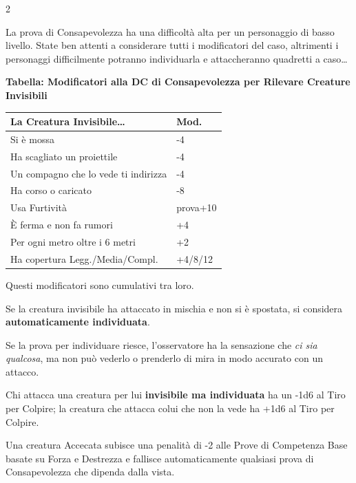 \begin{multicols}{2}
\begin{narratore}[Invisibilità]
La prova di Consapevolezza ha una difficoltà alta per un personaggio di basso livello. State ben attenti a considerare tutti i modificatori del caso, altrimenti i personaggi difficilmente potranno individuarla e attaccheranno quadretti a caso…
\end{narratore}

\bigskip

\textbf{Tabella: Modificatori alla DC di Consapevolezza per Rilevare Creature Invisibili}

\medskip

\noindent\begin{tabularx}{\linewidth}{Xl}
	\toprule
\rowcolor{gray!20}\textbf{La Creatura Invisibile…} & \textbf{Mod.}\\
\toprule
Si è mossa& -4\\
\rowcolor{gray!20}Ha scagliato un proiettile & -4\\
Un compagno che lo vede ti indirizza & -4\\
\rowcolor{gray!20}Ha corso o caricato& -8\\
Usa Furtività & prova+10\\
\rowcolor{gray!20}È ferma e non fa rumori & +4\\
Per ogni metro oltre i 6 metri & +2\\
\rowcolor{gray!20}Ha copertura Legg./Media/Compl. & +4/8/12
\end{tabularx}

\medskip

Questi modificatori sono cumulativi tra loro.

Se la creatura invisibile ha attaccato in mischia e non si è spostata, si considera \textbf{automaticamente individuata}.

Se la prova per individuare riesce, l'osservatore ha la sensazione che \emph{ci sia qualcosa}, ma non può vederlo o prenderlo di mira in modo accurato con un attacco.

Chi attacca una creatura per lui \textbf{invisibile ma individuata} ha un -1d6 al Tiro per Colpire; la creatura che attacca colui che non la vede ha +1d6 al Tiro per Colpire.

Una creatura Accecata  subisce una penalità di -2 alle Prove di Competenza Base basate su Forza e Destrezza e fallisce automaticamente qualsiasi prova di Consapevolezza che dipenda dalla vista.


\end{multicols}
